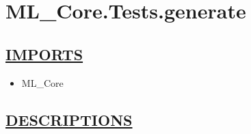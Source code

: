 \chapter*{ML\_Core.Tests.generate}
\hypertarget{ecldoc:toc:ML_Core.Tests.generate}{}

\section*{\underline{IMPORTS}}
\begin{itemize}
\item ML\_Core
\end{itemize}

\section*{\underline{DESCRIPTIONS}}
